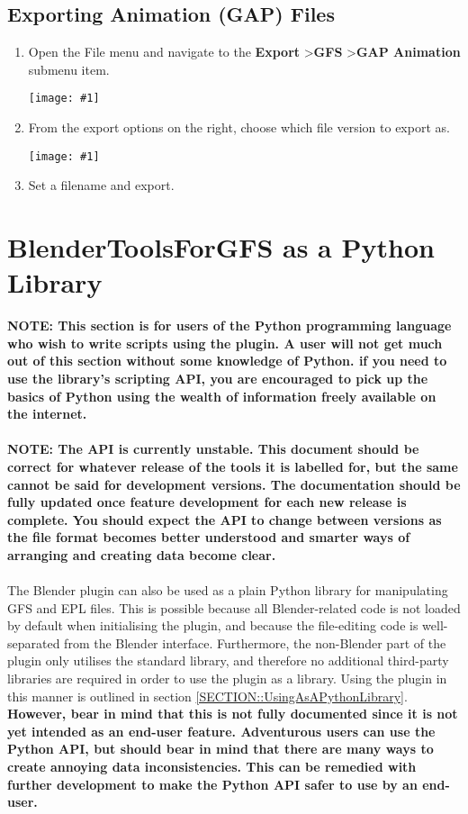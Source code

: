 \documentclass{article}
\newenvironment{guide}[1]
{
	\begin{center}
		\begin{tcolorbox}[%
			colback=black!20, 
			boxrule=0pt, 
			title=Step-by-step: #1,
			enhanced,
			breakable,
			overlay unbroken={%
                \draw[line width=1pt, black, rounded corners]
        	    (frame.north west) rectangle (frame.south east);
			},
    		overlay first={%
        		 \draw[line width=1pt, black, rounded corners]
        	    (frame.south west) -- (frame.north west) -- (frame.north east) -- (frame.south east);
                \draw[line width=1pt, black]
                (frame.south west) -- (frame.south east);
            },
    		overlay middle={%
                \draw[line width=1pt, black]
        	    (frame.north west) rectangle (frame.south east);
        	},
    		overlay last={%
                \draw[line width=1pt, black, rounded corners]
        	    (frame.north west) -- (frame.south west) -- (frame.south east) -- (frame.north east);
                \draw[line width=1pt, black]
                (frame.north west) -- (frame.north east);
           	}
        ]{}
    	\begin{enumerate}
}
{
    		\end{enumerate}
    	\end{tcolorbox}
	\end{center}  	 
}
\newcommand{\guideimage}[1]
{
	\begin{center}
		\texttt{[image: \#1]}
	\end{center}
}
\begin{document}
\subsection{Exporting Animation (GAP) Files}
\label{SECTION::EXPORT::ExportingAnimations}
\begin{guide}{Accessing the Animation Export Menu}
\item Open the File menu and navigate to the \textbf{Export} \textgreater\space \textbf{GFS} \textgreater\space \textbf{GAP Animation} submenu item.
\guideimage{images/export/export_gap.png}
\item From the export options on the right, choose which file version to export as.
\guideimage{images/export/export_gap_properties.png}
\item Set a filename and export.
\end{guide}

\clearpage

\section{BlenderToolsForGFS as a Python Library}
\label{SECTION::PythonLibrary}
\textbf{NOTE: This section is for users of the Python programming language who wish to write scripts using the plugin. A user will not get much out of this section without some knowledge of Python. if you need to use the library's scripting API, you are encouraged to pick up the basics of Python using the wealth of information freely available on the internet.}\\\\
\noindent
\textbf{NOTE: The API is currently unstable. This document should be correct for whatever release of the tools it is labelled for, but the same cannot be said for development versions. The documentation should be fully updated once feature development for each new release is complete. You should expect the API to change between versions as the file format becomes better understood and smarter ways of arranging and creating data become clear.}
\\\\
\noindent
The Blender plugin can also be used as a plain Python library for manipulating GFS and EPL files. This is possible because all Blender-related code is not loaded by default when initialising the plugin, and because the file-editing code is well-separated from the Blender interface. Furthermore, the non-Blender part of the plugin only utilises the standard library, and therefore no additional third-party libraries are required in order to use the plugin as a library. Using the plugin in this manner is outlined in section \ref{SECTION::UsingAsAPythonLibrary}. \textbf{However, bear in mind that this is not fully documented since it is not yet intended as an end-user feature. Adventurous users can use the Python API, but should bear in mind that there are many ways to create annoying data inconsistencies. This can be remedied with further development to make the Python API safer to use by an end-user.}
\end{document}
